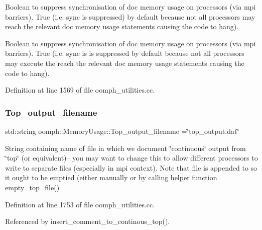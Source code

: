 Boolean to suppress synchronisation of doc memory usage on processors (via mpi barriers). True (i.\+e. sync is suppressed) by default because not all processors may reach the relevant doc memory usage statements causing the code to hang). 

Boolean to suppress synchronisation of doc memory usage on processors (via mpi barriers). True (i.\+e. sync is is suppressed by default because not all processors may execute the reach the relevant doc memory usage statements causing the code to hang). 

Definition at line 1569 of file oomph\+\_\+utilities.\+cc.

\mbox{\label{namespaceoomph_1_1MemoryUsage_a03231c21b4d9a8b4a08cecc3d688c7d3}} 
\subsubsection{\texorpdfstring{Top\+\_\+output\+\_\+filename}{Top\_output\_filename}}
{\footnotesize\ttfamily std\+::string oomph\+::\+Memory\+Usage\+::\+Top\+\_\+output\+\_\+filename =\char`\"{}top\+\_\+output.\+dat\char`\"{}}



String containing name of file in which we document \char`\"{}continuous\char`\"{} output from \char`\"{}top\char`\"{} (or equivalent)-- you may want to change this to allow different processors to write to separate files (especially in mpi context). Note that file is appended to so it ought to be emptied (either manually or by calling helper function \hyperlink{namespaceoomph_1_1MemoryUsage_a0034019640ac5f6ffe7e8e40fae1e453}{empty\+\_\+top\+\_\+file()} 



Definition at line 1753 of file oomph\+\_\+utilities.\+cc.



Referenced by insert\+\_\+comment\+\_\+to\+\_\+continous\+\_\+top().

\mbox{\label{namespaceoomph_1_1MemoryUsage_a61c07afc6531dcc4f77ae2f2b738383f}} 
